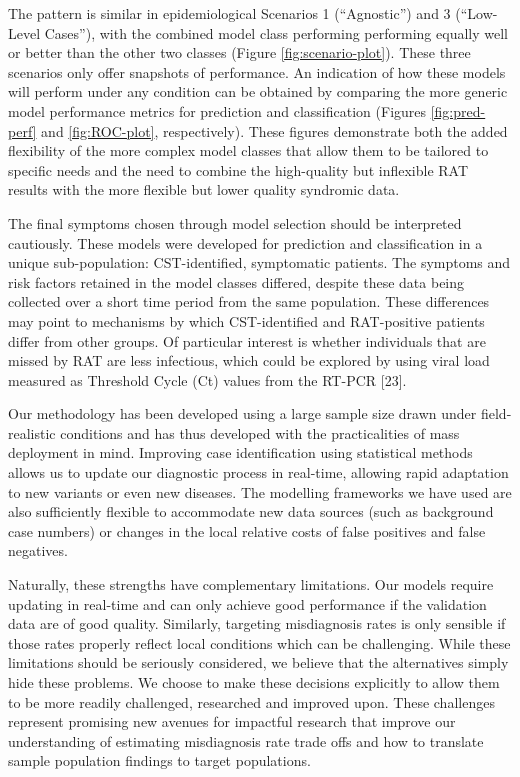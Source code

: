\documentclass[]{elsarticle} %
\begin{document}
The pattern is similar in epidemiological Scenarios 1 (``Agnostic'') and 3 (``Low-Level Cases''), with the combined model class performing performing equally well or better than the other two classes (Figure \ref{fig:scenario-plot}).
These three scenarios only offer snapshots of performance.
An indication of how these models will perform under any condition can be obtained by comparing the more generic model performance metrics for prediction and classification (Figures \ref{fig:pred-perf} and \ref{fig:ROC-plot}, respectively).
These figures demonstrate both the added flexibility of the more complex model classes that allow them to be tailored to specific needs and the need to combine the high-quality but inflexible RAT results with the more flexible but lower quality syndromic data.

The final symptoms chosen through model selection should be interpreted cautiously.
These models were developed for prediction and classification in a unique sub-population: CST-identified, symptomatic patients.
The symptoms and risk factors retained in the model classes differed, despite these data being collected over a short time period from the same population.
These differences may point to mechanisms by which CST-identified and RAT-positive patients differ from other groups.
Of particular interest is whether individuals that are missed by RAT are less infectious, which could be explored by using viral load measured as Threshold Cycle (Ct) values from the RT-PCR {[}23{]}.

Our methodology has been developed using a large sample size drawn under field-realistic conditions and has thus developed with the practicalities of mass deployment in mind.
Improving case identification using statistical methods allows us to update our diagnostic process in real-time, allowing rapid adaptation to new variants or even new diseases.
The modelling frameworks we have used are also sufficiently flexible to accommodate new data sources (such as background case numbers) or changes in the local relative costs of false positives and false negatives.

Naturally, these strengths have complementary limitations.
Our models require updating in real-time and can only achieve good performance if the validation data are of good quality.
Similarly, targeting misdiagnosis rates is only sensible if those rates properly reflect local conditions which can be challenging.
While these limitations should be seriously considered, we believe that the alternatives simply hide these problems.
We choose to make these decisions explicitly to allow them to be more readily challenged, researched and improved upon.
These challenges represent promising new avenues for impactful research that improve our understanding of estimating misdiagnosis rate trade offs and how to translate sample population findings to target populations.
\end{document}
